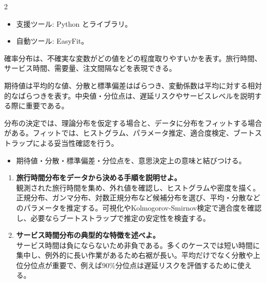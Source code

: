 \clearpage
{}
\begin{multicols}{2}\footnotesize\raggedcolumns
{}
\begin{itemize}
\item 支援ツール: Python とライブラリ。
\item 自動ツール: EasyFit。
\end{itemize}
確率分布は、不確実な変数がどの値をどの程度取りやすいかを表す。旅行時間、サービス時間、需要量、注文間隔などを表現できる。\par

期待値は平均的な値、分散と標準偏差はばらつき、変動係数は平均に対する相対的なばらつきを表す。中央値・分位点は、遅延リスクやサービスレベルを説明する際に重要である。\par

分布の決定では、理論分布を仮定する場合と、データに分布をフィットする場合がある。フィットでは、ヒストグラム、パラメータ推定、適合度検定、ブートストラップによる妥当性確認を行う。\par
{}
\begin{itemize}
\item 期待値・分散・標準偏差・分位点を、意思決定上の意味と結びつける。
\end{itemize}
\begin{enumerate}
\item \textbf{旅行時間分布をデータから決める手順を説明せよ。}\\観測された旅行時間を集め、外れ値を確認し、ヒストグラムや密度を描く。正規分布、ガンマ分布、対数正規分布など候補分布を選び、平均・分散などのパラメータを推定する。可視化やKolmogorov-Smirnov検定で適合度を確認し、必要ならブートストラップで推定の安定性を検査する。
\item \textbf{サービス時間分布の典型的な特徴を述べよ。}\\サービス時間は負にならないため非負である。多くのケースでは短い時間に集中し、例外的に長い作業があるため右裾が長い。平均だけでなく分散や上位分位点が重要で、例えば90\%分位点は遅延リスクを評価するために使える。
\end{enumerate}
\end{multicols}


